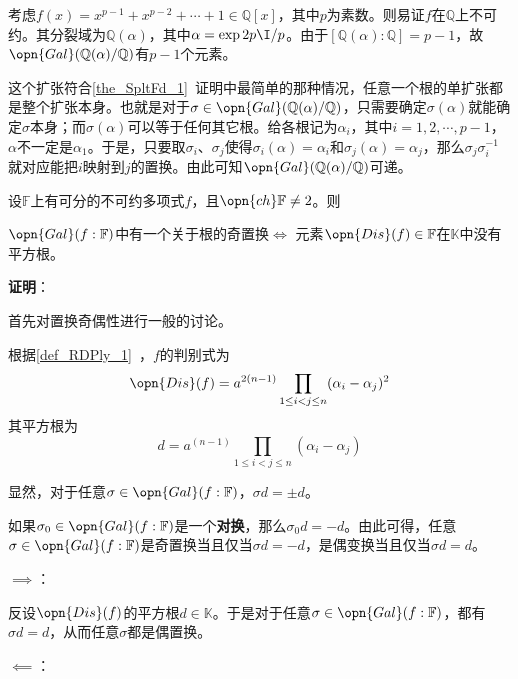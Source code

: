 \begin{example}{}
考虑$f(x)=x^{p-1}+x^{p-2}+\cdots+1\in\mathbb{Q}[x]$，其中$p$为素数。则易证$f$在$\mathbb{Q}$上不可约。其分裂域为$\mathbb{Q}(\alpha)$，其中$\alpha=\exp{2p\I/p}$。由于$[\mathbb{Q}(\alpha):\mathbb{Q}]=p-1$，故$\opn{Gal}(\mathbb{Q}(\alpha)/\mathbb{Q})$有$p-1$个元素。

这个扩张符合\autoref{the_SpltFd_1}~证明中最简单的那种情况，任意一个根的单扩张都是整个扩张本身。也就是对于$\sigma\in\opn{Gal}(\mathbb{Q}(\alpha)/\mathbb{Q})$，只需要确定$\sigma(\alpha)$就能确定$\sigma$本身；而$\sigma(\alpha)$可以等于任何其它根。给各根记为$\alpha_i$，其中$i=1, 2, \cdots, p-1$，$\alpha$不一定是$\alpha_1$。于是，只要取$\sigma_i$、$\sigma_j$使得$\sigma_i(\alpha)=\alpha_i$和$\sigma_j(\alpha)=\alpha_j$，那么$\sigma_j\sigma_i^{-1}$就对应能把$i$映射到$j$的置换。由此可知$\opn{Gal}(\mathbb{Q}(\alpha)/\mathbb{Q})$可递。
\end{example}


\begin{theorem}{}
设$\mathbb{F}$上有可分的不可约多项式$f$，且$\opn{ch}\mathbb{F}\neq 2$。则

$\opn{Gal}(f:\mathbb{F})$中有一个关于根的奇置换$\iff$ 元素$\opn{Dis}(f)\in\mathbb{F}$在$\mathbb{K}$中没有平方根。
\end{theorem}

\textbf{证明}：

首先对置换奇偶性进行一般的讨论。

根据\autoref{def_RDPly_1}~，$f$的判别式为
\begin{equation}
\opn{Dis}(f) = a^{2(n-1)}\prod_{1\leq i<j\leq n}(\alpha_i-\alpha_j)^2
\end{equation}
其平方根为
\begin{equation}
d = a^{(n-1)}\prod_{1\leq i<j\leq n}(\alpha_i-\alpha_j)
\end{equation}

显然，对于任意$\sigma\in\opn{Gal}(f:\mathbb{F})$，$\sigma d=\pm d$。

如果$\sigma_0\in\opn{Gal}(f:\mathbb{F})$是一个\textbf{对换}，那么$\sigma_0 d=-d$。由此可得，任意$\sigma\in\opn{Gal}(f:\mathbb{F})$是奇置换当且仅当$\sigma d=-d$，是偶变换当且仅当$\sigma d=d$。

$\implies$：

反设$\opn{Dis}(f)$的平方根$d\in\mathbb{K}$。于是对于任意$\sigma\in\opn{Gal}(f:\mathbb{F})$，都有$\sigma d = d$，从而任意$\sigma$都是偶置换。

$\impliedby$：

